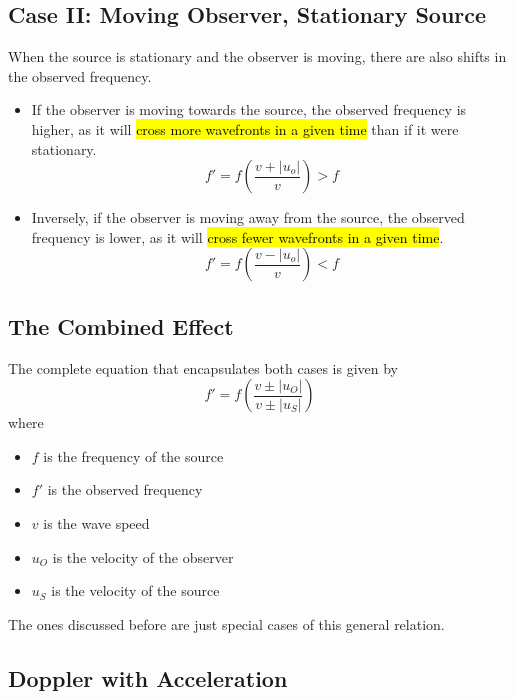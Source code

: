 \documentclass[a4paper,12pt]{article}
\newcommand{\paren}[1]{\left(#1\right)}
\begin{document}
\pagebreak


\subsection{Case II: Moving Observer, Stationary Source}

When the source is stationary and the observer is moving, there are also shifts in the observed frequency.
\begin{itemize}
  \item If the observer is moving towards the source, the observed frequency is higher, as it will \hl{cross more wavefronts in a given time} than if it were stationary.
        \begin{equation}
          f' = f\paren{\frac{v + |u_o|}{v}} > f
        \end{equation}
  \item Inversely, if the observer is moving away from the source, the observed frequency is lower, as it will \hl{cross fewer wavefronts in a given time}.
        \begin{equation}
          f' = f\paren{\frac{v - |u_o|}{v}} < f
        \end{equation}
\end{itemize}

\subsection{The Combined Effect}

The complete equation that encapsulates both cases is given by
\begin{equation}
  f' = f\paren{\frac{v\pm |u_O|}{v\pm |u_S|}}
\end{equation}
where
\begin{itemize}
  \item $f$ is the frequency of the source
  \item $f'$ is the observed frequency
  \item $v$ is the wave speed
  \item $u_O$ is the velocity of the observer
  \item $u_S$ is the velocity of the source
\end{itemize}

The ones discussed before are just special cases of this general relation.
\subsection{Doppler with Acceleration}
\end{document}
